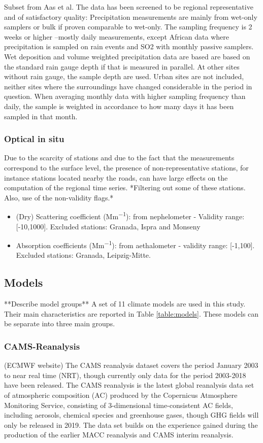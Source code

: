\documentclass[journal abbreviation, manuscript]{copernicus}
\begin{document}
Subset from Aas et al.
The data has been screened to be regional representative and of satisfactory quality:
Precipitation measurements are mainly from wet-only samplers or bulk if proven comparable to wet-only.
The sampling frequency is 2 weeks or higher –mostly daily measurements, except African data where precipitation is sampled on rain events and SO2 with monthly passive samplers.
Wet deposition and volume weighted precipitation data are based are based on the standard rain gauge depth if that is measured in parallel. At other sites without rain gauge, the sample depth are used.
Urban sites are not included, neither sites where the surroundings have changed considerable in the period in question.
When averaging monthly data with higher sampling frequency than daily, the sample is weighted in accordance to how many days it has been sampled in that month.

\subsubsection{Optical in situ}
Due to the scarcity of stations and due to the fact that the measurements correspond to the surface level, the presence of non-representative stations, for instance stations located nearby the roads, can have large effects on the computation of the regional time series.  *Filtering out some of these stations. Also, use of the non-validity flags.*

\begin{itemize}
 \item (Dry) Scattering coefficient (\unit{Mm^{-1}}): from nephelometer - Validity range: [-10,1000]. Excluded stations: Granada, Ispra and Monseny
 \item Absorption coefficients (\unit{Mm^{-1}}): from aethalometer - validity range: [-1,100]. Excluded stations: Granada, Leipzig-Mitte.
\end{itemize}

\subsection{Models}
**Describe model groups**
A set of 11 climate models are used in this study. Their main characteristics are reported in Table \ref{table:models}. These models can be separate into three main groups.

\subsubsection{CAMS-Reanalysis}
(ECMWF website) The CAMS reanalysis dataset covers the period January 2003 to near real time (NRT), though currently only data for the period 2003-2018 have been released. The CAMS reanalysis is the latest global reanalysis data set of atmospheric composition (AC) produced by the Copernicus Atmosphere Monitoring Service, consisting of 3-dimensional time-consistent AC fields, including aerosols, chemical species and greenhouse gases, though GHG fields will only be released in 2019. The data set builds on the experience gained during the production of the earlier MACC reanalysis and CAMS interim reanalysis.
\end{document}
